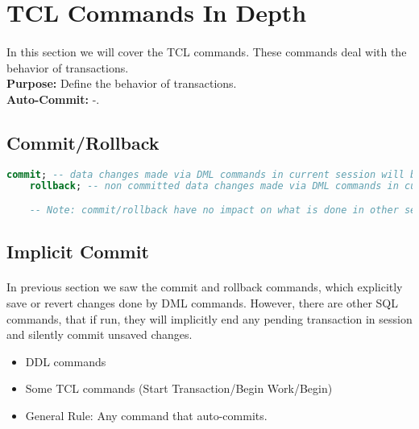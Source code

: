 
\section{\acs{TCL} Commands In Depth}
\paragraph{} In this section we will cover the \acf{TCL} commands. These commands deal with the behavior of transactions.\\\textbf{Purpose:} Define the behavior of transactions.\\\textbf{Auto-Commit:} -.
\subsection{Commit/Rollback}
\begin{lstlisting}[language=SQL]
	commit; -- data changes made via DML commands in current session will be made permanent
	rollback; -- non committed data changes made via DML commands in current session will be reverted
	
	-- Note: commit/rollback have no impact on what is done in other sessions
\end{lstlisting}
\subsection{Implicit Commit}
\paragraph{} In previous section we saw the commit and rollback commands, which explicitly save or revert changes done by \acs{DML} commands. However, there are other \acs{SQL} commands, that if run, they will implicitly end any pending transaction in session and silently commit unsaved changes.
\begin{itemize}
	\item \acs{DDL} commands
	\item Some \acs{TCL} commands (Start Transaction/Begin Work/Begin)
	\item General Rule: Any command that auto-commits.
\end{itemize}

